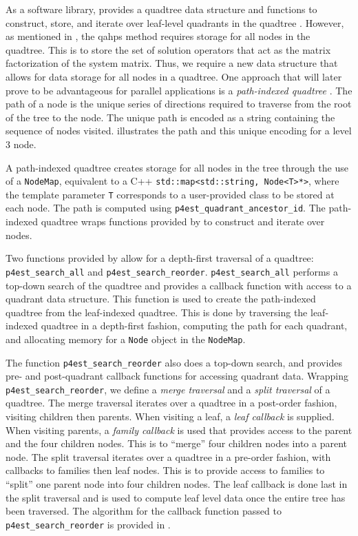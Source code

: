 As a software library, \pforest provides a quadtree data structure and functions to construct, store, and iterate over leaf-level quadrants in the quadtree \citep{burstedde2011p4est}. However, as mentioned in , the \gls{qahps} method requires storage for all nodes in the quadtree. This is to store the set of solution operators that act as the matrix factorization of the system matrix. Thus, we require a new data structure that allows for data storage for all nodes in a quadtree. One approach that will later prove to be advantageous for parallel applications is a {\em path-indexed quadtree} \citep{woodward1982explicit,samet1984quadtree}. The path of a node is the unique series of directions required to traverse from the root of the tree to the node. The unique path is encoded as a string containing the sequence of nodes visited.   illustrates the path and this unique encoding for a level 3 node.

A path-indexed quadtree creates storage for all nodes in the tree through the use of a \texttt{NodeMap}, equivalent to a C++ \texttt{std::map<std::string, Node<T>*>}, where the template parameter \texttt{T} corresponds to a user-provided class to be stored at each node. The path is computed using \texttt{p4est\_quadrant\_ancestor\_id}. The path-indexed quadtree wraps functions provided by \pforest to construct and iterate over nodes.

Two functions provided by \pforest allow for a depth-first traversal of a \pforest quadtree: \texttt{p4est\_search\_all} and \texttt{p4est\_search\_reorder}. \texttt{p4est\_search\_all} performs a top-down search of the quadtree and provides a callback function with access to a \pforest quadrant data structure. This function is used to create the path-indexed quadtree from the leaf-indexed quadtree. This is done by traversing the leaf-indexed quadtree in a depth-first fashion, computing the path for each quadrant, and allocating memory for a \texttt{Node} object in the \texttt{NodeMap}.

The function \texttt{p4est\_search\_reorder} also does a top-down search, and provides pre- and post-quadrant callback functions for accessing quadrant data. Wrapping \texttt{p4est\_search\_reorder}, we define a {\em merge traversal} and a {\em split traversal} of a quadtree. The merge traversal iterates over a quadtree in a post-order fashion, visiting children then parents. When visiting a leaf, a {\em leaf callback} is supplied. When visiting parents, a {\em family callback} is used that provides access to the parent and the four children nodes. This is to ``merge'' four children nodes into a parent node. The split traversal iterates over a quadtree in a pre-order fashion, with callbacks to families then leaf nodes. This is to provide access to families to ``split'' one parent node into four children nodes. The leaf callback is done last in the split traversal and is used to compute leaf level data once the entire tree has been traversed. The algorithm for the callback function passed to \texttt{p4est\_search\_reorder} is provided in .

